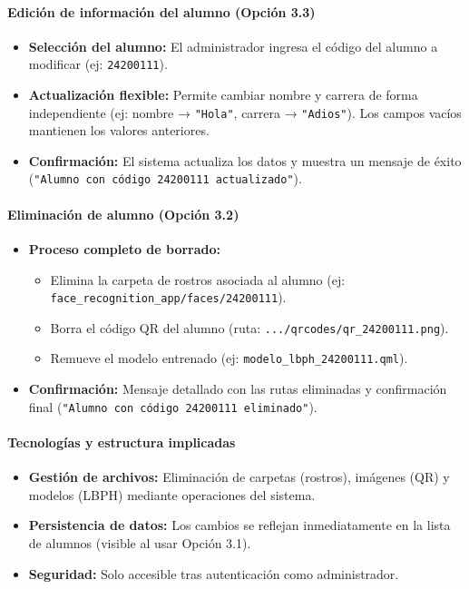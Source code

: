\documentclass[12pt]{article}
\begin{document}
{\paragraph{Edición de información del alumno (Opción 3.3)}
\begin{itemize}
    \item \textbf{Selección del alumno:} El administrador ingresa el código del alumno a modificar (ej: \texttt{24200111}).
    \item \textbf{Actualización flexible:} Permite cambiar nombre y carrera de forma independiente (ej: nombre → \texttt{"Hola"}, carrera → \texttt{"Adios"}). Los campos vacíos mantienen los valores anteriores.
    \item \textbf{Confirmación:} El sistema actualiza los datos y muestra un mensaje de éxito (\texttt{"Alumno con código 24200111 actualizado"}).
\end{itemize}

\paragraph{Eliminación de alumno (Opción 3.2)}
\begin{itemize}
    \item \textbf{Proceso completo de borrado:}
    \begin{itemize}
        \item Elimina la carpeta de rostros asociada al alumno (ej: \texttt{face\_recognition\_app/faces/24200111}).
        \item Borra el código QR del alumno (ruta: \texttt{.../qrcodes/qr\_24200111.png}).
        \item Remueve el modelo entrenado (ej: \texttt{modelo\_lbph\_24200111.qml}).
    \end{itemize}
    \item \textbf{Confirmación:} Mensaje detallado con las rutas eliminadas y confirmación final (\texttt{"Alumno con código 24200111 eliminado"}).
\end{itemize}

\paragraph{Tecnologías y estructura implicadas}
\begin{itemize}
    \item \textbf{Gestión de archivos:} Eliminación de carpetas (rostros), imágenes (QR) y modelos (LBPH) mediante operaciones del sistema.
    \item \textbf{Persistencia de datos:} Los cambios se reflejan inmediatamente en la lista de alumnos (visible al usar Opción 3.1).
    \item \textbf{Seguridad:} Solo accesible tras autenticación como administrador.
\end{itemize}

}
\end{document}
